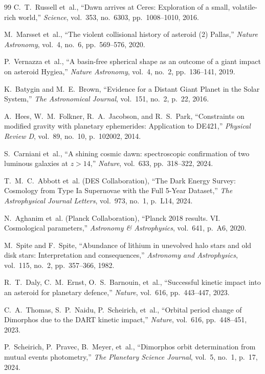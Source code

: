 \documentclass[11pt,a4paper]{article}
\begin{document}
\begin{thebibliography}{99}
C.~T.~Russell et~al., ``Dawn arrives at Ceres: Exploration of a small, volatile-rich world,'' \textit{Science}, vol.~353, no.~6303, pp.~1008--1010, 2016.

M.~Marsset et~al., ``The violent collisional history of asteroid (2) Pallas,'' \textit{Nature Astronomy}, vol.~4, no.~6, pp.~569--576, 2020.

P.~Vernazza et~al., ``A basin-free spherical shape as an outcome of a giant impact on asteroid Hygiea,'' \textit{Nature Astronomy}, vol.~4, no.~2, pp.~136--141, 2019.

K.~Batygin and M.~E.~Brown, ``Evidence for a Distant Giant Planet in the Solar System,'' \textit{The Astronomical Journal}, vol.~151, no.~2, p.~22, 2016.

A.~Hees, W.~M.~Folkner, R.~A.~Jacobson, and R.~S.~Park, ``Constraints on modified gravity with planetary ephemerides: Application to DE421,'' \textit{Physical Review D}, vol.~89, no.~10, p.~102002, 2014.

S.~Carniani et~al., ``A shining cosmic dawn: spectroscopic confirmation of two luminous galaxies at $z > 14$,'' \textit{Nature}, vol.~633, pp.~318--322, 2024.

T.~M.~C.~Abbott et~al. (DES Collaboration), ``The Dark Energy Survey: Cosmology from Type Ia Supernovae with the Full 5-Year Dataset,'' \textit{The Astrophysical Journal Letters}, vol.~973, no.~1, p.~L14, 2024.

N.~Aghanim et~al. (Planck Collaboration), ``Planck 2018 results. VI. Cosmological parameters,'' \textit{Astronomy \& Astrophysics}, vol.~641, p.~A6, 2020.

M.~Spite and F.~Spite, ``Abundance of lithium in unevolved halo stars and old disk stars: Interpretation and consequences,'' \textit{Astronomy and Astrophysics}, vol.~115, no.~2, pp.~357--366, 1982.

R.~T.~Daly, C.~M.~Ernst, O.~S.~Barnouin, et~al., ``Successful kinetic impact into an asteroid for planetary defence,'' \textit{Nature}, vol.~616, pp.~443--447, 2023.

C.~A.~Thomas, S.~P.~Naidu, P.~Scheirich, et~al., ``Orbital period change of Dimorphos due to the DART kinetic impact,'' \textit{Nature}, vol.~616, pp.~448--451, 2023.

P.~Scheirich, P.~Pravec, B.~Meyer, et~al., ``Dimorphos orbit determination from mutual events photometry,'' \textit{The Planetary Science Journal}, vol.~5, no.~1, p.~17, 2024.


\end{thebibliography}
\end{document}
